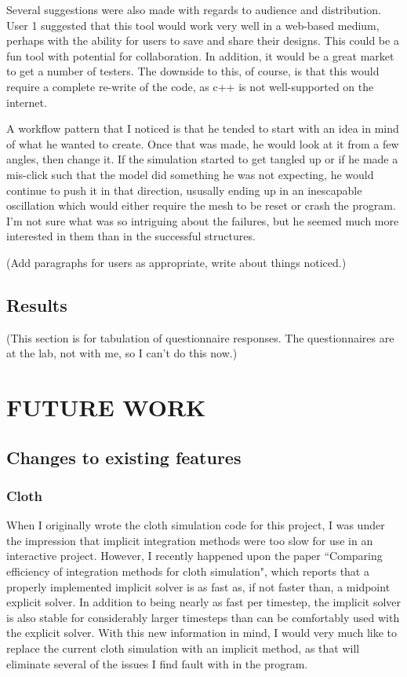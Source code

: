 \documentclass{thesis}
\begin{document}
Several suggestions were also made with regards to audience and distribution.  User 1 suggested that this tool would work very well in
a web-based medium, perhaps with the ability for users to save and share their designs.  This could be a fun tool with potential for
collaboration.  In addition, it would be a great market to get a number of testers.  The downside to this, of course, is that this
would require a complete re-write of the code, as c++ is not well-supported on the internet.

A workflow pattern that I noticed is that he tended to start with an idea in mind of what he wanted to create.  Once that was made,
he would look at it from a few angles, then change it.  If the simulation started to get tangled up or if he made a mis-click
such that the model did something he was not expecting, he would continue to push it in that direction, ususally ending up in an
inescapable oscillation which would either require the mesh to be reset or crash the program.  I'm not sure what was so intriguing
about the failures, but he seemed much more interested in them than in the successful structures.

(Add paragraphs for users as appropriate, write about things noticed.)

\section{Results}
(This section is for tabulation of questionnaire responses.  The questionnaires are at the lab, not with me, so I can't do this now.)


\chapter{FUTURE WORK}

\section{Changes to existing features}

\subsection{Cloth}
When I originally wrote the cloth simulation code for this project, I was under the impression that implicit integration methods were
too slow for use in an interactive project.  However, I recently happened upon the paper ``Comparing efficiency of integration methods
for cloth simulation"\cite{volino01comparingefficiency}\nocite{volino00fastcloth}, which reports that a properly implemented implicit
solver is as fast as, if not faster than, a midpoint explicit solver.  In addition to being nearly as fast per timestep, the implicit
solver is also stable for considerably larger timesteps than can be comfortably used with the explicit solver.  With this new
information in mind, I would very much like to replace the current cloth simulation with an implicit method, as that will eliminate
several of the issues I find fault with in the program.
\end{document}
